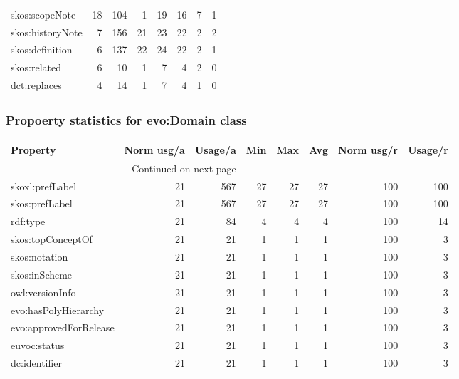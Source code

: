 \documentclass[10pt,a4paper,titlepage,final]{article}
\begin{document}
\begin{longtable}{lrrrrrrr}
         skos:scopeNote &          18 &      104 &    1 &   19 &   16 &           7 &        1 \\
       skos:historyNote &           7 &      156 &   21 &   23 &   22 &           2 &        2 \\
        skos:definition &           6 &      137 &   22 &   24 &   22 &           2 &        1 \\
           skos:related &           6 &       10 &    1 &    7 &    4 &           2 &        0 \\
           dct:replaces &           4 &       14 &    1 &    7 &    4 &           1 &        0 \\
\end{longtable}


\subsubsection{Propoerty statistics for evo:Domain class}
\begin{longtable}{lrrrrrrr}
\toprule
               Property &  Norm usg/a &  Usage/a &  Min &  Max &  Avg &  Norm usg/r &  Usage/r \\
\midrule
\endhead
\midrule
\multicolumn{3}{r}{{Continued on next page}} \\
\midrule
\endfoot

\bottomrule
\endlastfoot
        skoxl:prefLabel &          21 &      567 &   27 &   27 &   27 &         100 &      100 \\
         skos:prefLabel &          21 &      567 &   27 &   27 &   27 &         100 &      100 \\
               rdf:type &          21 &       84 &    4 &    4 &    4 &         100 &       14 \\
      skos:topConceptOf &          21 &       21 &    1 &    1 &    1 &         100 &        3 \\
          skos:notation &          21 &       21 &    1 &    1 &    1 &         100 &        3 \\
          skos:inScheme &          21 &       21 &    1 &    1 &    1 &         100 &        3 \\
        owl:versionInfo &          21 &       21 &    1 &    1 &    1 &         100 &        3 \\
   evo:hasPolyHierarchy &          21 &       21 &    1 &    1 &    1 &         100 &        3 \\
 evo:approvedForRelease &          21 &       21 &    1 &    1 &    1 &         100 &        3 \\
           euvoc:status &          21 &       21 &    1 &    1 &    1 &         100 &        3 \\
          dc:identifier &          21 &       21 &    1 &    1 &    1 &         100 &        3 \\
\end{longtable}
\end{document}

